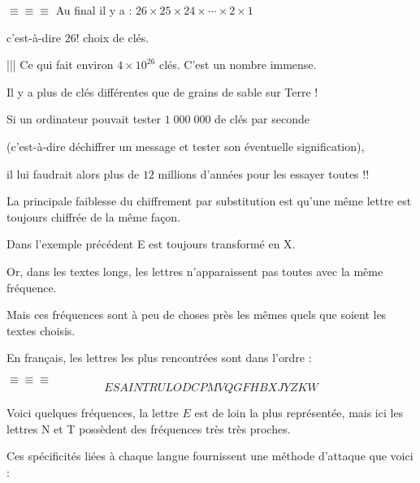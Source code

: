 $\equiv \equiv \equiv $ Au final il y a : $26\times 25 \times 24 \times \cdots \times 2 \times 1$ 

\change

c'est-à-dire $26!$ choix de clés.

\change

||| Ce qui fait environ $4 \times 10^{26}$ clés. C'est un nombre immense.

Il y a plus de clés différentes que de grains de sable
sur Terre ! 

\change

Si un ordinateur pouvait tester $1 \; 000\; 000$ de clés par seconde 

(c'est-à-dire déchiffrer un message et tester son éventuelle signification), 

il lui faudrait alors plus de $12$ millions d'années pour les essayer toutes !!



\diapo

\change

La principale faiblesse du chiffrement par substitution est qu'une même lettre
est toujours chiffrée de la même façon. 

Dans l'exemple précédent E est toujours transformé en X.

\change

Or, dans les textes longs, les lettres %
n'apparaissent pas toutes avec la même fréquence.

Mais ces fréquences sont à peu de choses près les mêmes quels que soient les textes choisis. 

\change

En français, les lettres les plus rencontrées sont dans l'ordre : 

$\equiv \equiv \equiv $ 
$${E S A I N T R U L O D C P M V Q G F H B X J Y Z K W}$$


\change

Voici quelques fréquences, la lettre $E$ est de loin la plus représentée, mais ici les lettres N et T possèdent des fréquences très très proches.


\change

Ces spécificités liées à chaque langue fournissent une méthode d'attaque que voici : 


